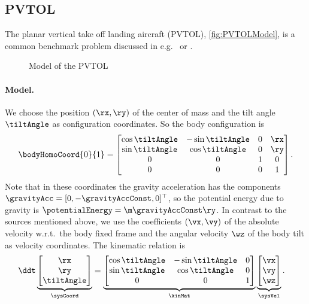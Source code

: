 \subsection{PVTOL}
The planar vertical take off landing aircraft (PVTOL), \autoref{fig:PVTOLModel}, is a common benchmark problem discussed in e.g.\ \cite{Hauser:PVTOL} or \cite{Fliess:LieBacklund}.
\begin{figure}[ht]
 \centering
 
 \caption{Model of the PVTOL}
 \label{fig:PVTOLModel}
\end{figure}

\paragraph{Model.}
We choose the position $(\rx, \ry)$ of the center of mass and the tilt angle $\tiltAngle$ as configuration coordinates.
So the body configuration is
\begin{align}
 \bodyHomoCoord{0}{1} = \begin{bmatrix} \cos\tiltAngle & -\sin\tiltAngle & 0 & \rx \\ \sin\tiltAngle & \cos\tiltAngle & 0 & \ry \\ 0 & 0 & 1 & 0 \\ 0 & 0 & 0 & 1 \end{bmatrix}.
\end{align}
Note that in these coordinates the gravity acceleration has the components $\gravityAcc = [0,-\gravityAccConst,0]^\top$, so the potential energy due to gravity is $\potentialEnergy = \m \gravityAccConst \ry$.
In contrast to the sources mentioned above, we use the coefficients $(\vx, \vy)$ of the absolute velocity w.r.t.\ the body fixed frame and the angular velocity $\wz$ of the body tilt as velocity coordinates.
The kinematic relation is 
\begin{align}
 \ddt
 \underbrace{\begin{bmatrix} \rx \\ \ry \\ \tiltAngle \end{bmatrix}}_{\sysCoord}
 &= 
 \underbrace{\begin{bmatrix} \cos\tiltAngle & -\sin\tiltAngle & 0 \\ \sin\tiltAngle & \cos\tiltAngle & 0 \\ 0 & 0 & 1 \end{bmatrix}}_{\kinMat}
 \underbrace{\begin{bmatrix} \vx \\ \vy \\ \wz \end{bmatrix}}_{\sysVel}.
\end{align}
